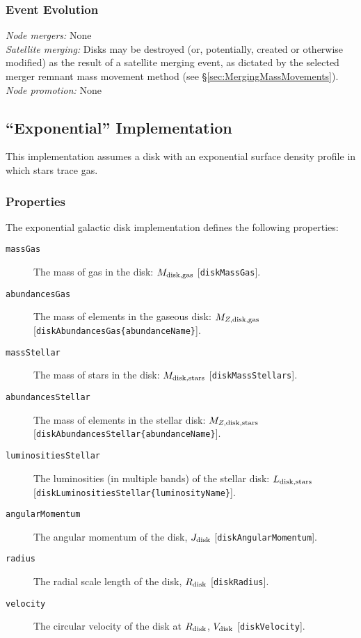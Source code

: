 \subsubsection{Event Evolution}

\noindent\emph{Node mergers:} None\\

\noindent\emph{Satellite merging:} Disks may be destroyed (or, potentially, created or otherwise modified) as the result of a satellite merging event, as dictated by the selected merger remnant mass movement method (see \S\ref{sec:MergingMassMovements}).\\

\noindent\emph{Node promotion:} None\\

\subsection{``Exponential'' Implementation}\label{sec:DiskExponential}

This implementation assumes a disk with an exponential surface density profile in which stars trace gas.

\subsubsection{Properties}

The exponential galactic disk implementation defines the following properties:
\begin{description}
 \item [{\tt massGas}] The mass of gas in the disk: $M_{\rm disk, gas}$ [{\tt diskMassGas}].
 \item [{\tt abundancesGas}] The mass of elements in the gaseous disk: $M_{Z, {\rm disk, gas}}$ [{\tt diskAbundancesGas\{abundanceName\}}].
 \item [{\tt massStellar}] The mass of stars in the disk: $M_{\rm disk, stars}$ [{\tt diskMassStellars}].
 \item [{\tt abundancesStellar}] The mass of elements in the stellar disk: $M_{Z, {\rm disk, stars}}$ [{\tt diskAbundancesStellar\{abundanceName\}}].
 \item [{\tt luminositiesStellar}] The luminosities (in multiple bands) of the stellar disk: $L_{\rm disk, stars}$ [{\tt diskLuminositiesStellar\{luminosityName\}}].
 \item [{\tt angularMomentum}] The angular momentum of the disk, $J_{\rm disk}$ [{\tt diskAngularMomentum}].
 \item [{\tt radius}] The radial scale length of the disk, $R_{\rm disk}$ [{\tt diskRadius}].
 \item [{\tt velocity}] The circular velocity of the disk at $R_{\rm disk}$, $V_{\rm disk}$ [{\tt diskVelocity}].
\end{description}

